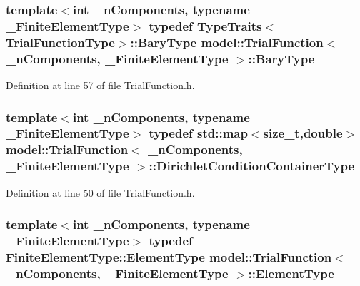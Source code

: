 \subsubsection[{Bary\+Type}]{\setlength{\rightskip}{0pt plus 5cm}template$<$int \+\_\+n\+Components, typename \+\_\+\+Finite\+Element\+Type$>$ typedef {\bf Type\+Traits}$<${\bf Trial\+Function\+Type}$>$\+::{\bf Bary\+Type} {\bf model\+::\+Trial\+Function}$<$ \+\_\+n\+Components, \+\_\+\+Finite\+Element\+Type $>$\+::{\bf Bary\+Type}}\label{classmodel_1_1_trial_function_af4bd713419cc83660594065c9392bf2c}


Definition at line 57 of file Trial\+Function.\+h.

\hypertarget{classmodel_1_1_trial_function_ae83a85333510ff0e0823e6cb748774ed}{}
\subsubsection[{Dirichlet\+Condition\+Container\+Type}]{\setlength{\rightskip}{0pt plus 5cm}template$<$int \+\_\+n\+Components, typename \+\_\+\+Finite\+Element\+Type$>$ typedef std\+::map$<$size\+\_\+t,double$>$ {\bf model\+::\+Trial\+Function}$<$ \+\_\+n\+Components, \+\_\+\+Finite\+Element\+Type $>$\+::{\bf Dirichlet\+Condition\+Container\+Type}}\label{classmodel_1_1_trial_function_ae83a85333510ff0e0823e6cb748774ed}


Definition at line 50 of file Trial\+Function.\+h.

\hypertarget{classmodel_1_1_trial_function_a72000c5b5030b4738f1d54f149519a78}{}
\subsubsection[{Element\+Type}]{\setlength{\rightskip}{0pt plus 5cm}template$<$int \+\_\+n\+Components, typename \+\_\+\+Finite\+Element\+Type$>$ typedef Finite\+Element\+Type\+::\+Element\+Type {\bf model\+::\+Trial\+Function}$<$ \+\_\+n\+Components, \+\_\+\+Finite\+Element\+Type $>$\+::{\bf Element\+Type}}\label{classmodel_1_1_trial_function_a72000c5b5030b4738f1d54f149519a78}


